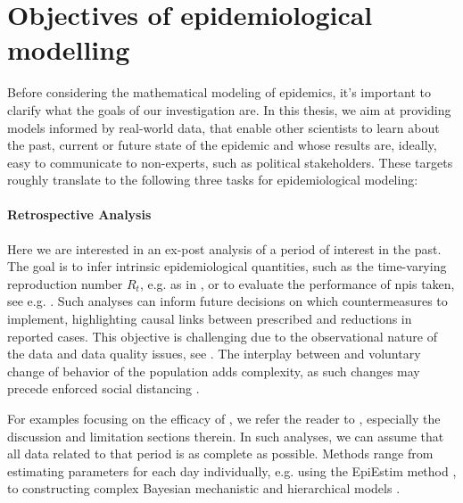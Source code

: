 \section{Objectives of epidemiological modelling}
\label{sec:objectives}

Before considering the mathematical modeling of epidemics, it's important to clarify what the goals of our investigation are. In this thesis, we aim at providing models informed by real-world data, that enable other scientists to learn about the past, current or future state of the epidemic and whose results are, ideally, easy to communicate to non-experts, such as political stakeholders.
These targets roughly translate to the following three tasks for epidemiological modeling:

\paragraph{Retrospective Analysis}
Here we are interested in an ex-post analysis of a period of interest in the past. The goal is to infer intrinsic epidemiological quantities, such as the time-varying reproduction number $R_{t}$, e.g. as in  \citep{Abbott2020Estimating}, or to evaluate the performance of \glspl{npi} taken, see e.g. \citep{Flaxman2020Estimating,Brauner2021Inferring,Khazaei2023Using}. Such analyses can inform future decisions on which countermeasures to implement, highlighting causal links between  prescribed and reductions in reported cases. This objective is challenging due to the observational nature of the data and data quality issues, see . The interplay between  and voluntary change of behavior of the population adds complexity, as such changes may precede enforced social distancing \citep{Gupta2020Mandated}. 

For examples focusing on the efficacy of , we refer the reader to \citep{Flaxman2020Estimating,Brauner2021Inferring,Khazaei2023Using}, especially the discussion and limitation sections therein. 
In such analyses, we can assume that all data related to that period is as complete as possible.
Methods range from estimating parameters for each day individually, e.g. using the EpiEstim \citep{Cori2021EpiEstim} method \citep{Abbott2020Estimating}, to constructing complex Bayesian mechanistic \citep{Flaxman2020Estimating} and hierarchical models \citep{Brauner2021Inferring,Khazaei2023Using}. 

